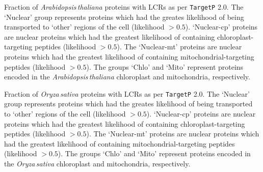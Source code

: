 \documentclass[a4paper,12pt]{article}
\newcommand{\arab}{\mbox{\textit{Arabidopsis\,thaliana}}\xspace}
\newcommand{\oryz}{\mbox{\textit{Oryza\,sativa}}\xspace}
\newcommand{\tget}{\mbox{\texttt{TargetP}}\xspace}
\begin{document}
\renewcommand{\location}{arab_targetp_lcrproportions}
\renewcommand{\nucNumber}{25941}
\newcommand{\nucChloNumber}{769}
\renewcommand{\nucMitoNumber}{573}
\newcommand{\chloNumber}{80}
\renewcommand{\mitoNumber}{114}
\begin{figure*}[ht]
    \caption{TargetP -- \arab}
    
    \centering\parbox{0.9\textwidth}{\footnotesize Fraction of \arab
    proteins with LCRs as per \tget 2.0.  The `Nuclear' group represents
    proteins which had the greates likelihood of being transported to
    `other' regions of the cell (likelihood $>0.5$). `Nuclear-cp' proteins
    are nuclear proteins which had the greatest likelihood of containing
    chloroplast-targeting peptides (likelihood $>0.5$). The `Nuclear-mt'
    proteins are nuclear proteins which had the greatest likelihood of
    containing mitochondrial-targeting peptides (likelihood $>0.5$). The
    groups `Chlo' and `Mito' represent proteins encoded in the \arab
    chloroplast and mitochondria, respectively.}
    \label{fig:histogramtargetparab}
\end{figure*}

\renewcommand{\location}{oryz_targetp_lcrproportions}
\renewcommand{\nucNumber}{42195}
\renewcommand{\nucChloNumber}{960}
\renewcommand{\nucMitoNumber}{374}
\renewcommand{\chloNumber}{83}
\renewcommand{\mitoNumber}{60}
\begin{figure*}[ht]
    \caption{TargetP -- \oryz}
    
    \centering\parbox{0.9\textwidth}{\footnotesize Fraction of \oryz proteins
    with LCRs as per \tget 2.0.  The `Nuclear' group represents proteins
    which had the greates likelihood of being transported to `other'
    regions of the cell (likelihood $>0.5$). `Nuclear-cp' proteins are
    nuclear proteins which had the greatest likelihood of containing
    chloroplast-targeting peptides (likelihood $>0.5$). The `Nuclear-mt'
    proteins are nuclear proteins which had the greatest likelihood of
    containing mitochondrial-targeting peptides (likelihood $>0.5$).
    The groups `Chlo' and `Mito' represent proteins encoded in the \oryz
    chloroplast and mitochondria, respectively.}
    \label{fig:histogramtargetporyz}
\end{figure*}
\end{document}
